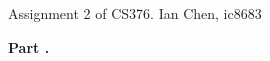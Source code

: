 \documentclass[11pt]{article}
\begin{document}
    Assignment 2 of CS376. Ian Chen, ic8683\newline

    \textbf{Part .}\newline
\end{document}
